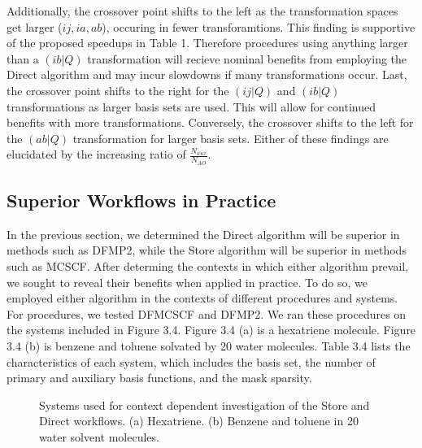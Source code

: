 Additionally, the crossover point shifts to the left as the transformation spaces get larger ($ij, ia, ab$), occuring in fewer transforamtions.
This finding is supportive of the proposed speedups in Table 1.
Therefore procedures using anything larger than a $(ib|Q)$ transformation will recieve nominal benefits from employing the 
Direct algorithm and may incur slowdowns if many transformations occur.
Last, the crossover point shifts to the right for the $(ij|Q)$ and $(ib|Q)$ transformations as larger basis sets are used. 
This will allow for 
continued benefits with more transformations. Conversely, the crossover shifts to the left for the $(ab|Q)$ transformation
for larger basis sets. Either of these findings are elucidated
by the increasing ratio of $\frac{N_{aux}}{N_{AO}}$. 
 

\subsection{Superior Workflows in Practice}

In the previous section, we determined the Direct algorithm will be superior in methods such as DFMP2, while the Store 
algorithm will be superior in methods such as MCSCF.
After determing the contexts in which either algorithm prevail, we sought to reveal their benefits when applied in practice. 
To do so, we employed either algorithm
in the contexts of different procedures and systems.  For procedures, we tested DFMCSCF and DFMP2.  We ran these 
procedures on the systems included in Figure 3.4.
Figure 3.4 (a) is a hexatriene molecule.  Figure 3.4 (b) is benzene and toluene solvated by 20 water molecules.
Table 3.4 lists the characteristics of each system,
which includes the basis set, the number of primary and auxiliary basis functions, and the mask sparsity. 


\begin{figure}[H]
  \captionsetup[subfigure]{}
  \centering
  \hfill
  \caption{Systems used for context dependent investigation of the Store and Direct workflows. (a) Hexatriene. (b) Benzene and toluene 
in 20 water solvent molecules. }
\end{figure}


